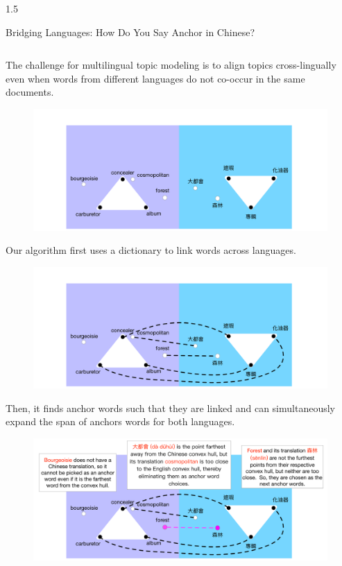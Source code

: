 \documentclass[final, 20pt]{beamer}
\newlength{\colwidth}
\begin{document}
\begin{frame}[t]
\begin{columns}[t]
\begin{column}{1.5\colwidth}
\begin{block}{Bridging Languages: How Do You Say Anchor in Chinese?}
\begin{columns}[t, totalwidth=\linewidth]
\begin{column}{0.62\textwidth}
The challenge for multilingual topic modeling is to align topics cross-lingually even when words from different languages do not co-occur in the same documents.

   \begin{figure}
	\centering
	\includegraphics[width=\linewidth]{multi_anchors1}
\end{figure}

\vspace{5cm}

Our algorithm first uses a dictionary to link words across languages.

\begin{figure}
	\centering
	\includegraphics[width=\linewidth]{multi_anchors2}
\end{figure}

\vspace{5cm}

Then, it finds anchor words such that they are linked and can simultaneously expand the span of anchors words for both languages.

\begin{figure}
	\centering
	\includegraphics[width=\linewidth]{multi_anchors6}
\end{figure}


\end{column}
\end{columns}
\end{block}
\end{column}
\end{columns}
\end{frame}
\end{document}
